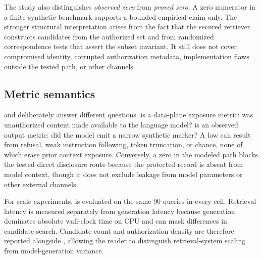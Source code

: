 The study also distinguishes \emph{observed zero} from \emph{proved zero}. A zero numerator in a finite synthetic benchmark supports a bounded empirical claim only. The stronger structural interpretation arises from the fact that the secured retriever constructs candidates from the authorized set and from randomized correspondence tests that assert the subset invariant. It still does not cover compromised identity, corrupted authorization metadata, implementation flaws outside the tested path, or other channels.

\subsection{Metric semantics}
\ucer{} and \udr{} deliberately answer different questions. \ucer{} is a data-plane exposure metric: was unauthorized content made available to the language model? \udr{} is an observed output metric: did the model emit a narrow synthetic marker? A low \udr{} can result from refusal, weak instruction following, token truncation, or chance, none of which erase prior context exposure. Conversely, a zero \ucer{} in the modeled path blocks the tested direct disclosure route because the protected record is absent from model context, though it does not exclude leakage from model parameters or other external channels.

For scale experiments, \arsr{} is evaluated on the same 90 queries in every cell. Retrieval latency is measured separately from generation latency because generation dominates absolute wall-clock time on CPU and can mask differences in candidate search. Candidate count and authorization density are therefore reported alongside \arsr{}, allowing the reader to distinguish retrieval-system scaling from model-generation variance.
